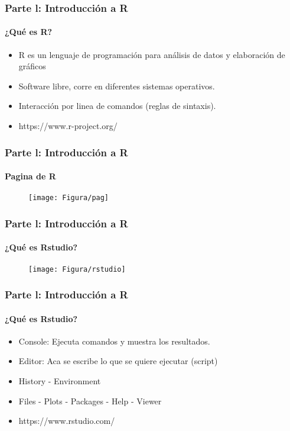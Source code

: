\documentclass[11pt]{beamer}
\begin{document}
\begin{frame}
\frametitle{Parte l: Introducción a R}
\framesubtitle{¿Qué es R?}
\begin{itemize}
\item R es un lenguaje de programación para análisis de datos y elaboración de gráficos
\item Software libre, corre en diferentes sistemas operativos.
\item Interacción por linea de comandos (reglas de sintaxis).
\item https://www.r-project.org/
\end{itemize}
\end{frame}

\begin{frame}
\frametitle{Parte l: Introducción a R}
\framesubtitle{Pagina de R}
\begin{figure}

\texttt{[image: Figura/pag]}
\centering
  \label{figure:Consumo}  
  \end{figure}
\end{frame}

\begin{frame}
\frametitle{Parte l: Introducción a R}
\framesubtitle{¿Qué es Rstudio?}
\begin{figure}

\texttt{[image: Figura/rstudio]}
\centering
  \label{figure:Consumo}  
  \end{figure}
\end{frame}



\begin{frame}
\frametitle{Parte l: Introducción a R}
\framesubtitle{¿Qué es Rstudio?}
\begin{itemize}
\item Console: Ejecuta comandos y muestra los resultados.
\item Editor: Aca se escribe lo que se quiere ejecutar (script)
\item History - Environment
\item Files - Plots - Packages - Help - Viewer
\item https://www.rstudio.com/
\end{itemize}
\end{frame}
\end{document}
